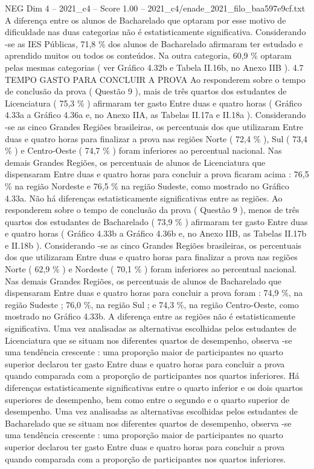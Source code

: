 \begin{textsample}{NEG Dim 4 – 2021\_c4 – Score 1.00 – 2021\_c4/enade\_2021\_filo\_baa597e9cf.txt}
A diferença entre os alunos de Bacharelado que optaram por esse motivo de dificuldade nas duas categorias não é estatisticamente significativa.
Considerando -se as IES Públicas, 71,8 \% dos alunos de Bacharelado afirmaram ter estudado e aprendido muitos ou todos os conteúdos.
Na outra categoria, 60,9 \% optaram pelas mesmas categorias ( ver Gráfico 4.32b e Tabela II.16b, no Anexo IIB ). 4.7 TEMPO GASTO PARA CONCLUIR A PROVA Ao responderem sobre o tempo de conclusão da prova ( Questão 9 ), mais de três quartos dos estudantes de Licenciatura ( 75,3 \% ) afirmaram ter gasto Entre duas e quatro horas ( Gráfico 4.33a a Gráfico 4.36a e, no Anexo IIA, as Tabelas II.17a e II.18a ).
Considerando -se as cinco Grandes Regiões brasileiras, os percentuais dos que utilizaram Entre duas e quatro horas para finalizar a prova nas regiões Norte ( 72,4 \% ), Sul ( 73,4 \% ) e Centro-Oeste ( 74,7 \% ) foram inferiores ao percentual nacional.
Nas demais Grandes Regiões, os percentuais de alunos de Licenciatura que dispensaram Entre duas e quatro horas para concluir a prova ficaram acima : 76,5 \% na região Nordeste e 76,5 \% na região Sudeste, como mostrado no Gráfico 4.33a.
Não há diferenças estatisticamente significativas entre as regiões.
Ao responderem sobre o tempo de conclusão da prova ( Questão 9 ), menos de três quartos dos estudantes de Bacharelado ( 73,9 \% ) afirmaram ter gasto Entre duas e quatro horas ( Gráfico 4.33b a Gráfico 4.36b e, no Anexo IIB, as Tabelas II.17b e II.18b ).
Considerando -se as cinco Grandes Regiões brasileiras, os percentuais dos que utilizaram Entre duas e quatro horas para finalizar a prova nas regiões Norte ( 62,9 \% ) e Nordeste ( 70,1 \% ) foram inferiores ao percentual nacional.
Nas demais Grandes Regiões, os percentuais de alunos de Bacharelado que dispensaram Entre duas e quatro horas para concluir a prova foram : 74,9 \%, na região Sudeste ; 76,0 \%, na região Sul ; e 74,3 \%, na região Centro-Oeste, como mostrado no Gráfico 4.33b.
A diferença entre as regiões não é estatisticamente significativa.
Uma vez analisadas as alternativas escolhidas pelos estudantes de Licenciatura que se situam nos diferentes quartos de desempenho, observa -se uma tendência crescente : uma proporção maior de participantes no quarto superior declarou ter gasto Entre duas e quatro horas para concluir a prova quando comparada com a proporção de participantes nos quartos inferiores.
Há diferenças estatisticamente significativas entre o quarto inferior e os dois quartos superiores de desempenho, bem como entre o segundo e o quarto superior de desempenho.
Uma vez analisadas as alternativas escolhidas pelos estudantes de Bacharelado que se situam nos diferentes quartos de desempenho, observa -se uma tendência crescente : uma proporção maior de participantes no quarto superior declarou ter gasto Entre duas e quatro horas para concluir a prova quando comparada com a proporção de participantes nos quartos inferiores.

\end{textsample}

